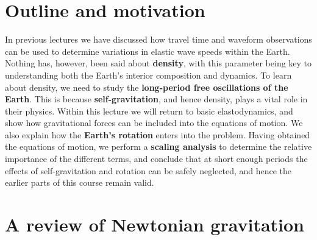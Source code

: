 \section*{Outline and motivation}

In previous lectures we have discussed how travel time and waveform observations can be used to determine variations in
 elastic wave speeds within the Earth. Nothing has, however, been said about \textbf{density}, with this parameter being key to 
 understanding both the Earth's interior composition and dynamics. To learn about density, we need to study the 
 \textbf{long-period free oscillations of the Earth}. This is because \textbf{self-gravitation}, and hence density, plays a vital role in 
 their physics. Within this lecture we will return to basic elastodynamics, and show how gravitational forces can be included 
 into the equations of motion. We also explain how the \textbf{Earth's rotation} enters into the problem. Having obtained the 
 equations of motion, we perform a \textbf{scaling analysis} to determine the relative importance of the different terms, and 
 conclude that at short enough periods the effects of self-gravitation and rotation can be safely neglected, and hence 
 the earlier parts of this course remain valid.

\section*{A review of Newtonian gravitation}

